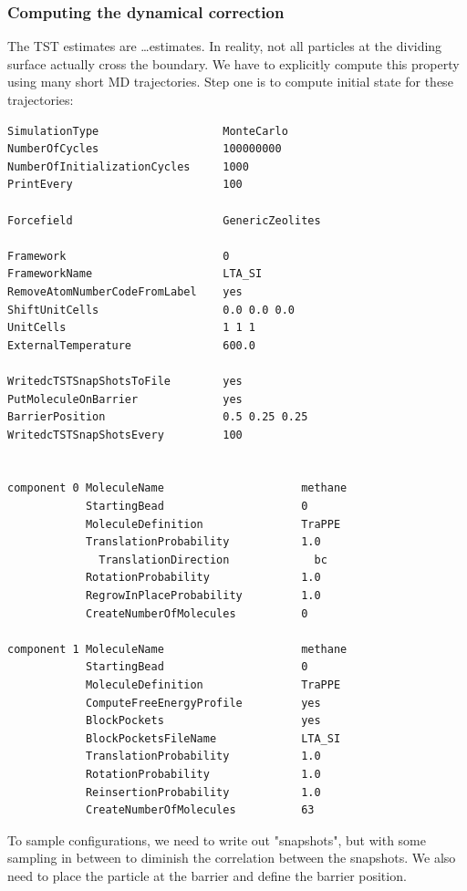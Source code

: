 \subsubsection{Computing the dynamical correction}

The TST estimates are \dots estimates. In reality, not all particles at the dividing surface actually cross
the boundary. We have to explicitly compute this property using many short MD trajectories.
Step one is to compute initial state for these trajectories:
\begin{tiny}
\begin{verbatim}
SimulationType                   MonteCarlo
NumberOfCycles                   100000000
NumberOfInitializationCycles     1000
PrintEvery                       100

Forcefield                       GenericZeolites

Framework                        0
FrameworkName                    LTA_SI
RemoveAtomNumberCodeFromLabel    yes
ShiftUnitCells                   0.0 0.0 0.0
UnitCells                        1 1 1
ExternalTemperature              600.0

WritedcTSTSnapShotsToFile        yes
PutMoleculeOnBarrier             yes
BarrierPosition                  0.5 0.25 0.25
WritedcTSTSnapShotsEvery         100


component 0 MoleculeName                     methane
            StartingBead                     0
            MoleculeDefinition               TraPPE
            TranslationProbability           1.0
              TranslationDirection             bc
            RotationProbability              1.0
            RegrowInPlaceProbability         1.0
            CreateNumberOfMolecules          0

component 1 MoleculeName                     methane
            StartingBead                     0
            MoleculeDefinition               TraPPE
            ComputeFreeEnergyProfile         yes
            BlockPockets                     yes
            BlockPocketsFileName             LTA_SI
            TranslationProbability           1.0
            RotationProbability              1.0
            ReinsertionProbability           1.0
            CreateNumberOfMolecules          63
\end{verbatim}
\end{tiny}

To sample configurations, we need to write out "snapshots", but with some sampling in between to diminish the
correlation between the snapshots. We also need to place the particle at the barrier and define the barrier position.

